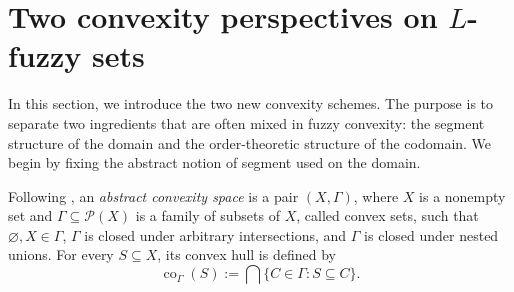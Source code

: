\documentclass[11pt,a4paper]{article}
\begin{document}








\section{Two convexity perspectives on \(L\)-fuzzy sets}\label{sec:convexity}

In this section, we introduce the two new convexity schemes. The purpose is to separate two ingredients that are often mixed in fuzzy convexity: the segment structure of the domain and the order-theoretic structure of the codomain. We begin by fixing the abstract notion of segment used on the domain.

\smallskip

Following \citep{vandeVel1993}, an \emph{abstract convexity space} is a pair \((X,\Gamma)\), where \(X\) is a nonempty set and \(\Gamma\subseteq\mathcal P(X)\) is a family of subsets of \(X\), called convex sets, such that \(\varnothing,X\in\Gamma\), \(\Gamma\) is closed under arbitrary intersections, and \(\Gamma\) is closed under nested unions. For every \(S\subseteq X\), its convex hull is defined by
\begin{equation*}
\operatorname{co}_{\Gamma}(S):=\bigcap\{C\in\Gamma:S\subseteq C\}.
\end{equation*}
\end{document}
